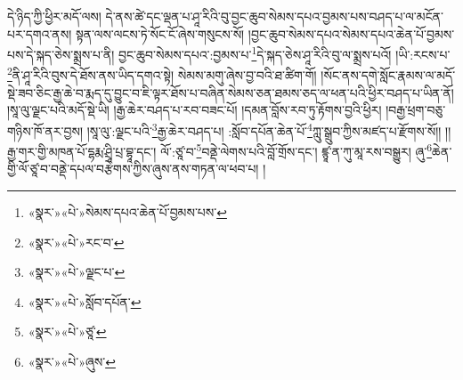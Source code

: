 དེ་ཉིད་ཀྱི་ཕྱིར་མདོ་ལས། དེ་ནས་ཚེ་དང་ལྡན་པ་ཤཱ་རིའི་བུ་བྱང་ཆུབ་སེམས་དཔའ་བྱམས་པས་བཤད་པ་ལ་མངོན་པར་དགའ་ནས། སྟན་ལས་ལངས་ཏེ་སོང་ངོ་ཞེས་གསུངས་སོ། །བྱང་ཆུབ་སེམས་དཔའ་སེམས་དཔའ་ཆེན་པོ་བྱམས་པས་དེ་སྐད་ཅེས་སྨྲས་པ་ནི། བྱང་ཆུབ་སེམས་དཔའ་:བྱམས་པ་\footnote{«སྣར་»«པེ་»སེམས་དཔའ་ཆེན་པོ་བྱམས་པས་}དེ་སྐད་ཅེས་ཤཱ་རིའི་བུ་ལ་སྨྲས་པའོ། །ཡི་:རངས་པ་\footnote{«སྣར་»«པེ་»རང་བ་}ནི་ཤཱ་རིའི་བུས་དེ་ཐོས་ནས་ཡིད་དགའ་སྟེ། སེམས་མགུ་ཞེས་བྱ་བའི་ཐ་ཚིག་གོ། །སོང་ནས་དགེ་སློང་རྣམས་ལ་མདོ་སྡེ་ཟབ་ཅིང་རྒྱ་ཆེ་བ་རྨད་དུ་བྱུང་བ་ཇི་ལྟར་ཐོས་པ་བཞིན་སེམས་ཅན་ཐམས་ཅད་ལ་ཕན་པའི་ཕྱིར་བཤད་པ་ཡིན་ནོ། །སཱ་ལུ་ལྗང་པའི་མདོ་སྡེ་ཡི། །རྒྱ་ཆེར་བཤད་པ་རབ་བཟང་པོ། །དམན་བློས་རབ་ཏུ་རྟོགས་བྱའི་ཕྱིར། །བརྒྱ་ཕྲག་བཅུ་གཉིས་ཁོ་ནར་བྱས། །སཱ་ལུ་:ལྗང་པའི་\footnote{«སྣར་»«པེ་»ལྗང་པ་}རྒྱ་ཆེར་བཤད་པ། :སློབ་དཔོན་ཆེན་པོ་\footnote{«སྣར་»«པེ་»སློབ་དཔོན་}ཀླུ་སྒྲུབ་ཀྱིས་མཛད་པ་རྫོགས་སོ།། །།རྒྱ་གར་གྱི་མཁན་པོ་དྷརྨ་ཤྲཱི་པྲ་བྷཱ་དང་། ལོ་:ཙཱ་བ་\footnote{«སྣར་»«པེ་»ཙཱ་}བནྡེ་ལེགས་པའི་བློ་གྲོས་དང་། ཛྙཱ་ན་ཀུ་མཱ་རས་བསྒྱུར། ཞུ་\footnote{«སྣར་»«པེ་»ཞུས་}ཆེན་གྱི་ལོ་ཙཱ་བ་བནྡེ་དཔལ་བརྩེགས་ཀྱིས་ཞུས་ནས་གཏན་ལ་ཕབ་པ། ། 